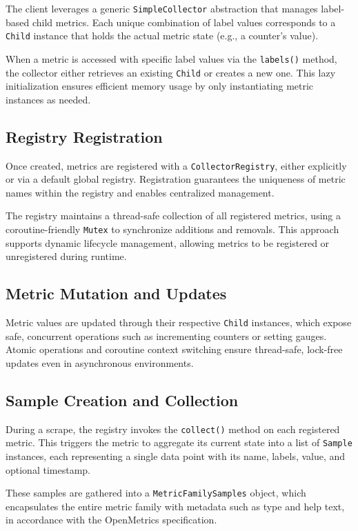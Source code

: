 The client leverages a generic \texttt{SimpleCollector} abstraction that manages label-based child metrics. Each unique combination of label values corresponds to a \texttt{Child} instance that holds the actual metric state (e.g., a counter’s value).

When a metric is accessed with specific label values via the \texttt{labels()} method, the collector either retrieves an existing \texttt{Child} or creates a new one. This lazy initialization ensures efficient memory usage by only instantiating metric instances as needed.

\subsection{Registry Registration}

Once created, metrics are registered with a \texttt{CollectorRegistry}, either explicitly or via a default global registry. Registration guarantees the uniqueness of metric names within the registry and enables centralized management.

The registry maintains a thread-safe collection of all registered metrics, using a coroutine-friendly \texttt{Mutex} to synchronize additions and removals. This approach supports dynamic lifecycle management, allowing metrics to be registered or unregistered during runtime.

\subsection{Metric Mutation and Updates}

Metric values are updated through their respective \texttt{Child} instances, which expose safe, concurrent operations such as incrementing counters or setting gauges. Atomic operations and coroutine context switching ensure thread-safe, lock-free updates even in asynchronous environments.

\subsection{Sample Creation and Collection}

During a scrape, the registry invokes the \texttt{collect()} method on each registered metric. This triggers the metric to aggregate its current state into a list of \texttt{Sample} instances, each representing a single data point with its name, labels, value, and optional timestamp.

These samples are gathered into a \texttt{MetricFamilySamples} object, which encapsulates the entire metric family with metadata such as type and help text, in accordance with the OpenMetrics specification.

